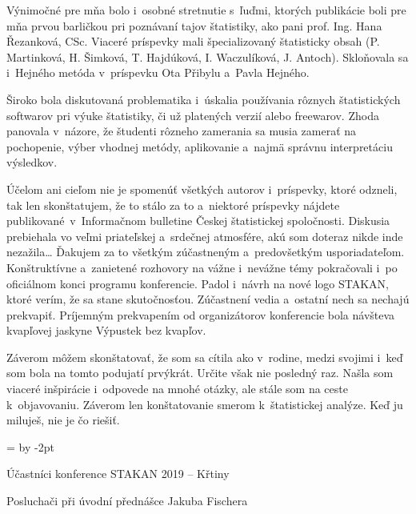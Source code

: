 Výnimočné pre mňa bolo i osobné stretnutie s ľuďmi, ktorých publikácie boli pre mňa prvou barličkou pri poznávaní tajov štatistiky, ako pani prof. Ing. Hana Řezanková, CSc. Viaceré príspevky mali  špecializovaný štatisticky obsah (P. Martinková, H. Šimková, T. Hajdúková, I. Waczulíková, J. Antoch). Skloňovala sa i Hejného metóda v príspevku Ota Přibylu a Pavla Hejného.  

Široko bola diskutovaná problematika i úskalia používania rôznych štatistických softwarov pri výuke štatistiky, či už platených verzií alebo freewarov. Zhoda panovala v názore, že študenti rôzneho zamerania sa musia zamerať na pochopenie, výber vhodnej metódy, aplikovanie a najmä správnu interpretáciu výsledkov.  

Účelom ani cieľom nie je spomenúť všetkých autorov i~príspevky, ktoré odzneli, tak len skonštatujem, že to stálo za to a niektoré príspevky nájdete publikované v Informačnom bulletine Českej štatistickej spoločnosti. Diskusia prebiehala vo veľmi priateľskej a srdečnej atmosfére, akú som doteraz nikde inde nezažila\ldots{} Ďakujem za to všetkým zúčastneným a predovšetkým usporiadateľom. Konštruktívne a zanietené rozhovory na vážne i nevážne témy pokračovali i po oficiálnom konci programu konferencie. Padol i návrh na nové logo STAKAN, ktoré verím, že sa stane skutočnosťou. Zúčastnení vedia a ostatní nech sa nechajú prekvapiť. Príjemným prekvapením od organizátorov konferencie bola návšteva kvapľovej jaskyne Výpustek bez kvapľov.

Záverom môžem skonštatovať, že som sa cítila ako v rodine, medzi svojimi  i keď som bola na tomto podujatí prvýkrát. Určite však nie posledný raz. Našla som viaceré inšpirácie i~odpovede na mnohé otázky, ale stále som na ceste k~objavovaniu. Záverom len konštatovanie smerom k štatistickej analýze. Keď ju miluješ, nie je čo riešiť.

\vfil

\parindent=0pt

\newdimen\maldelka \maldelka=\textwidth
\advance\maldelka by -2pt
\fboxrule=1pt
\fboxsep=0pt


\hfil Účastníci konference STAKAN 2019 -- Křtiny


\newpage
{}

\hfil Posluchači při úvodní přednášce Jakuba Fischera

\vfill

